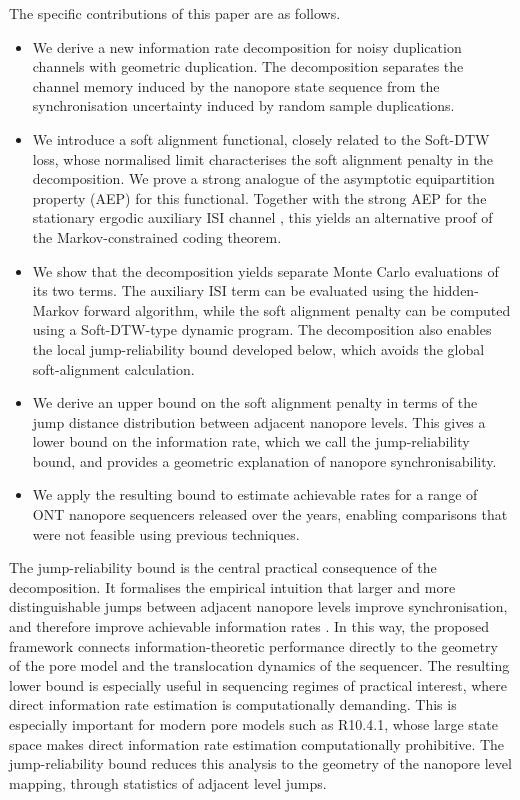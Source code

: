 \documentclass[onecolumn]{IEEEtran}
\theoremstyle{definition}
\begin{document}
The specific contributions of this paper are as follows.
\begin{itemize}
    \item We derive a new information rate decomposition for noisy duplication channels with geometric duplication. The decomposition separates the channel memory induced by the nanopore state sequence from the synchronisation uncertainty induced by random sample duplications.

    \item We introduce a soft alignment functional, closely related to the
Soft-DTW loss, whose normalised limit characterises the soft alignment
penalty in the decomposition. We prove {a strong analogue of
the asymptotic equipartition property (AEP)} for this functional. {Together with the strong AEP for the stationary ergodic auxiliary ISI channel \cite{CoverThomas}, this yields an alternative proof of the
Markov-constrained coding theorem.}

    \item We show that the decomposition
    {yields separate Monte Carlo evaluations of its two terms}.
    The auxiliary ISI term can be evaluated using the
    {hidden-Markov} forward algorithm, while the soft alignment
    penalty can be computed using a Soft-DTW-type dynamic program.
    {The decomposition also enables the local jump-reliability
    bound developed below, which avoids the global soft-alignment calculation.}

    \item We derive an upper bound on the soft alignment penalty in terms of
    the jump distance distribution between adjacent nanopore levels. This gives a
    lower bound on the information rate, which we call the jump-reliability
    bound, and provides a geometric explanation of nanopore synchronisability.

    \item We apply the resulting bound to estimate achievable rates for a range
    of ONT nanopore sequencers released over the years, enabling comparisons
    that were not feasible using previous techniques.
\end{itemize}

The jump-reliability bound is the central practical consequence of the decomposition. It formalises the empirical intuition that larger and more distinguishable jumps between adjacent nanopore levels improve synchronisation, and therefore improve achievable information rates \cite{McBain2022}. In this way, the proposed framework connects information-theoretic performance directly to the geometry of the pore model and the translocation dynamics of the sequencer. The resulting lower bound is especially useful in sequencing regimes of practical interest, where direct information rate estimation is computationally demanding. This is especially important for modern pore models such as R10.4.1, whose large state space makes direct information rate estimation computationally prohibitive. The jump-reliability bound reduces this analysis to the geometry of the nanopore level mapping, through statistics of adjacent level jumps.
\end{document}
